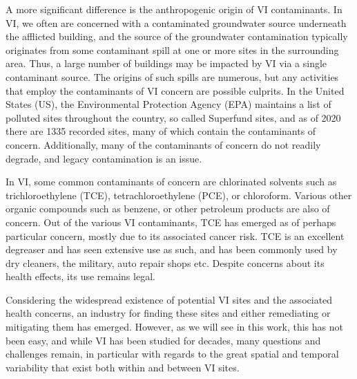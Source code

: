 A more significant difference is the anthropogenic origin of VI contaminants.
In VI, we often are concerned with a contaminated groundwater source underneath the afflicted building, and the source of the groundwater contamination typically originates from some contaminant spill at one or more sites in the surrounding area.
Thus, a large number of buildings may be impacted by VI via a single contaminant source.
The origins of such spills are numerous, but any activities that employ the contaminants of VI concern are possible culprits\cite{u.s._environmental_protection_agency_oswer_2015}.
In the United States (US), the Environmental Protection Agency (EPA) maintains a list of polluted sites throughout the country, so called Superfund sites, and as of 2020 there are 1335 recorded sites, many of which contain the contaminants of concern\cite{us_epa_current_2015,u.s._environmental_protection_agency_oswer_2015}. %
Additionally, many of the contaminants of concern do not readily degrade, and legacy contamination is an issue\cite{u.s._environmental_protection_agency_oswer_2015}.\par

In VI, some common contaminants of concern are chlorinated solvents such as trichloroethylene (TCE), tetrachloroethylene (PCE), or chloroform.
Various other organic compounds such as benzene, or other petroleum products are also of concern.
Out of the various VI contaminants, TCE has emerged as of perhaps particular concern, mostly due to its associated cancer risk.
TCE is an excellent degreaser and has seen extensive use as such, and has been commonly used by dry cleaners, the military, auto repair shops etc\cite{u.s._environmental_protection_agency_oswer_2015}.
Despite concerns about its health effects, its use remains legal.\par

Considering the widespread existence of potential VI sites and the associated health concerns, an industry for finding these sites and either remediating or mitigating them has emerged.
However, as we will see in this work, this has not been easy, and while VI has been studied for decades, many questions and challenges remain, in particular with regards to the great spatial and temporal variability that exist both within and between VI sites\cite{u.s._environmental_protection_agency_oswer_2015}.\par
